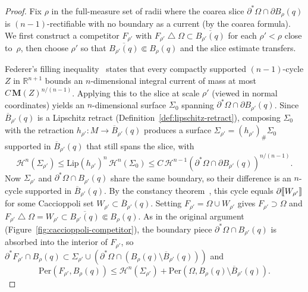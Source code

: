 \begin{proof}
Fix $\rho$ in the full-measure set of radii where the coarea slice $\partial^*\Omega \cap \partial B_\rho(q)$ is $(n-1)$-rectifiable with no boundary as a current (by the coarea formula).
We first construct a competitor $F_{\rho'}$ with $F_{\rho'} \mathbin{\triangle} \Omega \subset \overline{B_{\rho'}(q)}$ for each $\rho' < \rho$ close to~$\rho$, then choose $\rho'$ so that $\overline{B_{\rho'}(q)} \Subset B_\rho(q)$ and the slice estimate transfers.

Federer's filling inequality~\cite[4.5.9(31)]{Fed69} states that every compactly supported $(n-1)$-cycle $Z$ in $\mathbb{R}^{n+1}$ bounds an $n$-dimensional integral current of mass at most $C\,\mathbf{M}(Z)^{n/(n-1)}$.
Applying this to the slice at scale $\rho'$ (viewed in normal coordinates) yields an $n$-dimensional surface $\Sigma_0$ spanning $\partial^*\Omega \cap \partial B_{\rho'}(q)$.
Since $\overline{B}_{\rho'}(q)$ is a Lipschitz retract (Definition~\ref{def:lipschitz-retract}), composing $\Sigma_0$ with the retraction $h_{\rho'} \colon M \to \overline{B}_{\rho'}(q)$ produces a surface $\Sigma_{\rho'} = (h_{\rho'})_\#\Sigma_0$ supported in $\overline{B}_{\rho'}(q)$ that still spans the slice, with
\[
    \mathcal{H}^n(\Sigma_{\rho'}) \leq \mathrm{Lip}(h_{\rho'})^n \, \mathcal{H}^n(\Sigma_0) \leq C\,\mathcal{H}^{n-1}(\partial^*\Omega \cap \partial B_{\rho'}(q))^{n/(n-1)}.
\]
Now $\Sigma_{\rho'}$ and $\partial^*\Omega \cap B_{\rho'}(q)$ share the same boundary, so their difference is an $n$-cycle supported in $\overline{B}_{\rho'}(q)$.
By the constancy theorem~\cite[Theorem~26.27]{Sim83}, this cycle equals $\partial\llbracket W_{\rho'} \rrbracket$ for some Caccioppoli set $W_{\rho'} \subset \overline{B}_{\rho'}(q)$.
Setting $F_{\rho'} = \Omega \cup W_{\rho'}$ gives $F_{\rho'} \supset \Omega$ and $F_{\rho'} \mathbin{\triangle} \Omega = W_{\rho'} \subset \overline{B_{\rho'}(q)} \Subset B_\rho(q)$.
As in the original argument (Figure~\ref{fig:caccioppoli-competitor}), the boundary piece $\partial^*\Omega \cap B_{\rho'}(q)$ is absorbed into the interior of $F_{\rho'}$, so $\partial^* F_{\rho'} \cap B_\rho(q) \subset \Sigma_{\rho'} \cup (\partial^*\Omega \cap (B_\rho(q) \setminus \overline{B}_{\rho'}(q)))$ and
\begin{equation}\label{eq:Frho-prime-bound}
    \mathrm{Per}(F_{\rho'}, B_\rho(q)) \leq \mathcal{H}^n(\Sigma_{\rho'}) + \mathrm{Per}(\Omega, B_\rho(q) \setminus \overline{B}_{\rho'}(q)).
\end{equation}


\end{proof}
